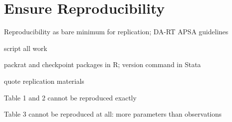 
\section{Ensure Reproducibility}

Reproducibility as bare minimum for replication; DA-RT APSA guidelines

script all work

packrat and checkpoint packages in R; version command in Stata

quote \citet{Newman2015} replication materials

Table 1 and 2 cannot be reproduced exactly

Table 3 cannot be reproduced at all: more parameters than observations
